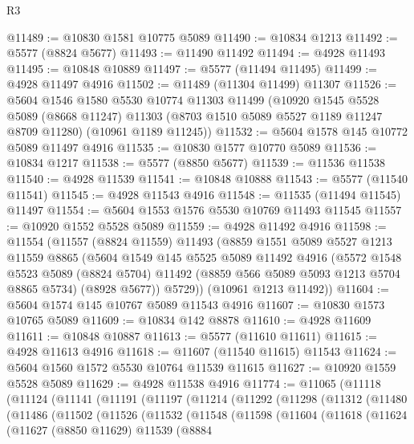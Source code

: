 \begin{lexlean}{R3}
\begin{coremodule}
@11489 := @10830 @1581 @10775 @5089
@11490 := @10834 @1213
@11492 := @5577 (@8824 @5677)
@11493 := @11490 @11492
@11494 := @4928 @11493
@11495 := @10848 @10889
@11497 := @5577 (@11494 @11495)
@11499 := @4928 @11497 @4916
@11502 := @11489 (@11304 @11499) @11307
@11526 := @5604
    @1546
    @1580
    @5530
    @10774
    @11303
    @11499
    (@10920
      @1545
      @5528
      @5089
      (@8668 @11247)
      @11303
      (@8703 @1510 @5089 @5527 @1189 @11247 @8709 @11280)
      (@10961 @1189 @11245))
@11532 := @5604 @1578 @145 @10772 @5089 @11497 @4916
@11535 := @10830 @1577 @10770 @5089
@11536 := @10834 @1217
@11538 := @5577 (@8850 @5677)
@11539 := @11536 @11538
@11540 := @4928 @11539
@11541 := @10848 @10888
@11543 := @5577 (@11540 @11541)
@11545 := @4928 @11543 @4916
@11548 := @11535 (@11494 @11545) @11497
@11554 := @5604 @1553 @1576 @5530 @10769 @11493 @11545
@11557 := @10920 @1552 @5528 @5089
@11559 := @4928 @11492 @4916
@11598 := @11554
    (@11557
      (@8824 @11559)
      @11493
      (@8859
        @1551
        @5089
        @5527
        @1213
        @11559
        @8865
        (@5604
          @1549
          @145
          @5525
          @5089
          @11492
          @4916
          (@5572
            @1548
            @5523
            @5089
            (@8824 @5704)
            @11492
            (@8859 @566 @5089 @5093 @1213 @5704 @8865 @5734)
            (@8928 @5677))
          @5729))
      (@10961 @1213 @11492))
@11604 := @5604 @1574 @145 @10767 @5089 @11543 @4916
@11607 := @10830 @1573 @10765 @5089
@11609 := @10834 @142 @8878
@11610 := @4928 @11609
@11611 := @10848 @10887
@11613 := @5577 (@11610 @11611)
@11615 := @4928 @11613 @4916
@11618 := @11607 (@11540 @11615) @11543
@11624 := @5604 @1560 @1572 @5530 @10764 @11539 @11615
@11627 := @10920 @1559 @5528 @5089
@11629 := @4928 @11538 @4916
@11774 := @11065
    (@11118
      (@11124
        (@11141
          (@11191
            (@11197
              (@11214
                (@11292
                  (@11298
                    (@11312
                      (@11480
                        (@11486
                          (@11502
                            (@11526
                              (@11532
                                (@11548
                                  (@11598
                                    (@11604
                                      (@11618
                                        (@11624
                                          (@11627
                                            (@8850 @11629)
                                            @11539
                                            (@8884

\end{coremodule}
\end{lexlean}
